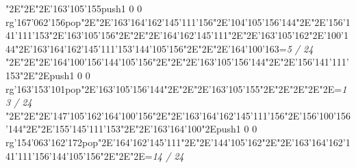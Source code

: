 \null\vfill\enskip\enskip\enskip\ipa\char"2E\enskip\enskip\enskip\ipa\char"2E\enskip\ipa\char"2E\ipa\char'163\ipa\char'105\ipa\char'155\bigskip\pdfcolorstack\match push{1 0 0 rg}\ipa\char'167\ipa\char'062\ipa\char'156\pdfcolorstack\match pop{}\ipa\char"2E\enskip\enskip\enskip\ipa\char"2E\ipa\char'163\ipa\char'164\ipa\char'162\ipa\char'145\ipa\char'111\ipa\char'156\bigskip\enskip\enskip\ipa\char"2E\ipa\char'104\ipa\char'105\ipa\char'156\ipa\char'144\ipa\char"2E\enskip\ipa\char"2E\ipa\char'156\ipa\char'141\ipa\char'111\ipa\char'153\ipa\char"2E\ipa\char'163\ipa\char'105\ipa\char'156\ipa\char"2E\enskip\enskip\enskip\ipa\char"2E\enskip\enskip\enskip\enskip\bigskip\enskip\ipa\char"2E\ipa\char'164\ipa\char'162\ipa\char'145\ipa\char'111\ipa\char"2E\enskip\enskip\ipa\char"2E\ipa\char'163\ipa\char'105\ipa\char'162\ipa\char"2E\ipa\char'100\ipa\char'144\ipa\char"2E\ipa\char'163\ipa\char'164\ipa\char'162\ipa\char'145\ipa\char'111\ipa\char'153\bigskip\ipa\char'144\ipa\char'105\ipa\char'156\ipa\char"2E\enskip\enskip\ipa\char"2E\enskip\enskip\enskip\ipa\char"2E\ipa\char'164\ipa\char'100\ipa\char'163\bigskip\vfill\footline={\hfill\tenrm\it 5 / 24}\eject
\null\vfill\enskip\enskip\enskip\ipa\char"2E\enskip\enskip\enskip\ipa\char"2E\enskip\ipa\char"2E\ipa\char'164\ipa\char'100\ipa\char'156\bigskip\ipa\char'144\ipa\char'105\ipa\char'156\ipa\char"2E\enskip\enskip\enskip\ipa\char"2E\enskip\enskip\enskip\enskip\enskip\enskip\bigskip\enskip\enskip\ipa\char"2E\ipa\char'163\ipa\char'105\ipa\char'156\ipa\char'144\ipa\char"2E\enskip\ipa\char"2E\ipa\char'156\ipa\char'141\ipa\char'111\ipa\char'153\ipa\char"2E\enskip\enskip\enskip\ipa\char"2E\pdfcolorstack\match push{1 0 0 rg}\ipa\char'163\ipa\char'153\ipa\char'101\pdfcolorstack\match pop{}\ipa\char"2E\ipa\char'163\ipa\char'105\ipa\char'156\ipa\char'144\bigskip\enskip\ipa\char"2E\enskip\enskip\enskip\enskip\ipa\char"2E\enskip\enskip\ipa\char"2E\ipa\char'163\ipa\char'105\ipa\char'155\ipa\char"2E\enskip\enskip\ipa\char"2E\enskip\enskip\enskip\enskip\enskip\enskip\bigskip\enskip\enskip\enskip\ipa\char"2E\enskip\enskip\ipa\char"2E\enskip\enskip\enskip\ipa\char"2E\enskip\enskip\enskip\bigskip\vfill\footline={\hfill\tenrm\it 13 / 24}\eject
\null\vfill\enskip\enskip\enskip\ipa\char"2E\enskip\enskip\enskip\ipa\char"2E\enskip\ipa\char"2E\ipa\char'147\ipa\char'105\ipa\char'162\bigskip\ipa\char'164\ipa\char'100\ipa\char'156\ipa\char"2E\enskip\enskip\enskip\ipa\char"2E\ipa\char'163\ipa\char'164\ipa\char'162\ipa\char'145\ipa\char'111\ipa\char'156\bigskip\enskip\enskip\ipa\char"2E\ipa\char'156\ipa\char'100\ipa\char'156\ipa\char'144\ipa\char"2E\enskip\ipa\char"2E\ipa\char'155\ipa\char'145\ipa\char'111\ipa\char'153\ipa\char"2E\enskip\enskip\enskip\ipa\char"2E\ipa\char'163\ipa\char'164\ipa\char'100\ipa\char"2E\pdfcolorstack\match push{1 0 0 rg}\ipa\char'154\ipa\char'063\ipa\char'162\ipa\char'172\pdfcolorstack\match pop{}\bigskip\enskip\ipa\char"2E\ipa\char'164\ipa\char'162\ipa\char'145\ipa\char'111\ipa\char"2E\enskip\enskip\ipa\char"2E\ipa\char'144\ipa\char'105\ipa\char'162\ipa\char"2E\enskip\enskip\ipa\char"2E\ipa\char'163\ipa\char'164\ipa\char'162\ipa\char'141\ipa\char'111\ipa\char'156\bigskip\ipa\char'144\ipa\char'105\ipa\char'156\ipa\char"2E\enskip\enskip\ipa\char"2E\enskip\enskip\enskip\ipa\char"2E\enskip\enskip\enskip\bigskip\vfill\footline={\hfill\tenrm\it 14 / 24}\eject
